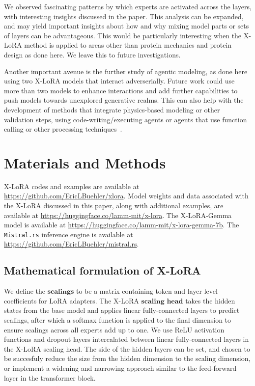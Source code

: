 \documentclass{article}
\begin{document}
We observed fascinating patterns by which experts are activated across the layers, with interesting insights discussed in the paper. This analysis can be expanded, and may yield important insights about how and why mixing model parts or sets of layers can be advantageous. This would be particularly interesting when the X-LoRA method is applied to areas other than protein mechanics and protein design as done here. We leave this to future investigations. 

Another important avenue is the further study of agentic modeling, as done here using two X-LoRA models that interact adverserially. Future work could use more than two models to enhance interactions and add further capabilities to push models towards unexplored generative realms. This can also help with the development of methods that integrate physics-based modeling or other validation steps, using code-writing/executing agents or agents that use function calling or other processing techniques~\cite{Ghafarollahi2024ProtAgents:Learning}. 


\section{Materials and Methods}

X-LoRA codes and examples are available at \url{https://github.com/EricLBuehler/xlora}. Model weights and data associated with the X-LoRA discussed in this paper, along with additional examples, are available at \url{https://huggingface.co/lamm-mit/x-lora}. The X-LoRA-Gemma model is available at \url{https://huggingface.co/lamm-mit/x-lora-gemma-7b}.  The \texttt{Mistral.rs} inference engine is available at \url{https://github.com/EricLBuehler/mistral.rs}.

\subsection{Mathematical formulation of X-LoRA}
We define the $\mathbf{scalings}$ to be a matrix containing token and layer level coefficients for LoRA adapters. The X-LoRA $\mathbf{scaling}$ $\mathbf{head}$ takes the hidden states from the base model and applies linear fully-connected layers to predict scalings, after which a softmax function is applied to the final dimension to ensure scalings across all experts add up to one. 
We use ReLU activation functions and dropout layers intercalated between linear fully-connected layers in the X-LoRA scaling head. The side of the hidden layers can be set, and chosen to be succesfuly reduce the size from the hidden dimension to the scaling dimension, or implement a widening and narrowing approach similar to the feed-forward layer in the transformer block. 
\end{document}
